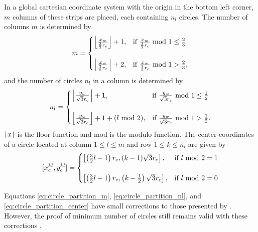 In a global cartesian coordinate system with the origin in the bottom left corner, $m$ columns of these strips are placed, each containing $n_l$ circles. The number of columns $m$ is determined by
\begin{equation} \label{eq:circle_partition_m}
m =
\begin{cases}
\floor*{ \frac{x_w}{\frac{3}{2}r_c} } + 1, & \text{if } \frac{x_w}{\frac{3}{2}r_c} \Mod{1} \leq \frac{2}{3} \\
\\
\floor*{ \frac{x_w}{\frac{3}{2}r_c} } + 2, & \text{if } \frac{x_w}{\frac{3}{2}r_c} \Mod{1} > \frac{2}{3}, \\
\end{cases}
\end{equation}
and the number of circles $n_l$ in a column is determined by
\begin{equation} \label{eq:circle_partition_nl}
n_l =
\begin{cases}
\floor*{ \frac{y_w}{\sqrt{3}r_c} } + 1, & \text{if } \frac{y_w}{\sqrt{3}r_c} \Mod{1} \leq \frac{1}{2} \\
\\
\floor*{ \frac{y_w}{\sqrt{3}r_c} } + 1 + (l \Mod{2}), & \text{if } \frac{y_w}{\sqrt{3}r_c} \Mod{1} > \frac{1}{2}. \\
\end{cases}
\end{equation}
$\floor*{x}$ is the floor function and mod is the modulo function. The center coordinates of a circle located at column $1 \leq l \leq m$ and row $1 \leq k \leq n_l$ are given by
\begin{equation} \label{eq:circle_partition_center}
[x_c^{kl}, y_c^{kl}] =
\begin{cases}
\left[ \left( \frac{3}{2}l - 1 \right)r_c, (k - 1)\sqrt{3}r_c \right], & \text{if } l \Mod{2} = 1 \\
\\
\left[ \left( \frac{3}{2}l - 1 \right)r_c, \left(k - \frac{1}{2}\right)\sqrt{3}r_c \right], & \text{if } l \Mod{2} = 0
\end{cases} 
\end{equation}

Equations \eqref{eq:circle_partition_m}, \eqref{eq:circle_partition_nl}, and \eqref{eq:circle_partition_center} have small corrections to those presented by \citet{guo2004coverage}. However, the proof of minimum number of circles still remains valid with these corrections \citep{Scibilia2012}.


